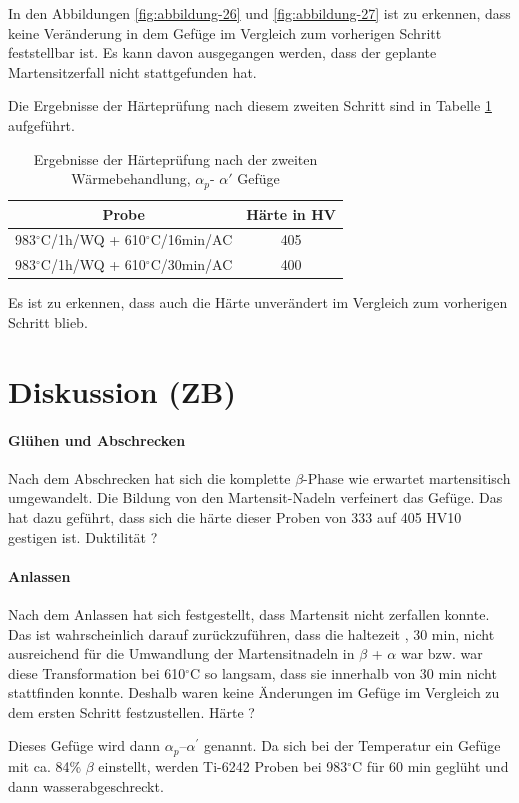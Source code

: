In den Abbildungen \ref{fig:abbildung-26} und \ref{fig:abbildung-27} ist zu erkennen, dass keine Veränderung in dem Gefüge im Vergleich zum vorherigen Schritt feststellbar ist. Es kann davon ausgegangen werden, dass der geplante Martensitzerfall nicht stattgefunden hat.

Die Ergebnisse der Härteprüfung nach diesem zweiten Schritt sind in Tabelle \ref{Tabelle 9} aufgeführt.

\begin{table}[h]
	\centering
	\begin{tabular}{|c|c|}
		\hline 
		Probe & Härte in HV \\ 
		\hline 
		983$^\circ$C/1h/WQ + 610$^\circ$C/16min/AC & 405 \\ 
		\hline 
		983$^\circ$C/1h/WQ + 610$^\circ$C/30min/AC & 400 \\ 
		\hline 
	\end{tabular} 
	\caption{Ergebnisse der Härteprüfung nach der zweiten Wärmebehandlung, $\alpha_p$- $\alpha'$ Gefüge}
	\label{Tabelle 9}
\end{table}

Es ist zu erkennen, dass auch die Härte unverändert im Vergleich zum vorherigen Schritt blieb.

\section{Diskussion (ZB)}

\paragraph{Glühen und Abschrecken}
Nach dem Abschrecken hat sich die komplette $\beta$-Phase wie erwartet martensitisch umgewandelt. Die Bildung von den Martensit-Nadeln verfeinert das Gefüge. Das hat dazu geführt, dass sich die härte dieser Proben von 333 auf 405 HV10 gestigen ist. Duktilität ?
\paragraph{Anlassen} Nach dem Anlassen hat sich festgestellt, dass Martensit nicht zerfallen konnte. Das ist wahrscheinlich darauf zurückzuführen, dass die haltezeit , 30 min, nicht ausreichend für die Umwandlung der Martensitnadeln in  $\beta$ + $\alpha$ war bzw. war diese Transformation bei 610$^\circ$C so langsam, dass sie innerhalb von 30 min nicht stattfinden konnte.
Deshalb waren keine Änderungen im Gefüge im Vergleich zu dem ersten Schritt  festzustellen. Härte ?

Dieses Gefüge wird dann $\alpha_p$--$\alpha^\prime$ genannt. Da sich bei der Temperatur ein Gefüge mit ca. 84\% $\beta$ einstellt, werden Ti-6242 Proben bei 983$^\circ$C für 60 min geglüht und dann wasserabgeschreckt.
